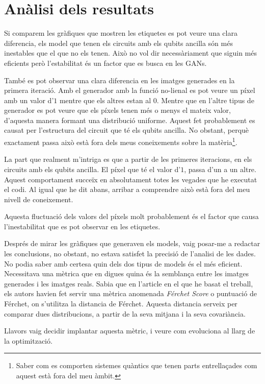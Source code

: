 \section{Anàlisi dels resultats}
Si comparem les gràfiques que mostren les etiquetes es pot veure una clara diferencia, els model que tenen els circuits amb els qubits ancilla són més inestables que el que no els tenen. Això no vol dir necessàriament que siguin més eficients però l'estabilitat és un factor que es busca en les GANs. 

També es pot observar una clara diferencia en les imatges generades en la primera iteració. Amb el generador amb la funció no-lienal es pot veure un píxel amb un valor d'$1$ mentre que els altres estan al $0$. Mentre que en l'altre tipus de generador es pot veure que els píxels tenen més o menys el mateix valor, d'aquesta manera formant una distribució uniforme. Aquest fet probablement es causat per l'estructura del circuit que té els qubits ancilla. No obstant, perquè exactament passa això està fora dels meus coneixements sobre la matèria\footnote{Saber com es comporten sistemes quàntics que tenen parts entrellaçades com aquest està fora del meu àmbit.}. 

La part que realment m'intriga es que a partir de les primeres iteracions, en els circuits amb els qubits ancilla. El píxel que té el valor d'$1$, passa d'un a un altre. Aquest comportament succeïx en absolutament totes les vegades que he executat el codi. Al igual que he dit abans, arribar a comprendre això està fora del meu nivell de coneixement. 

Aquesta fluctuació dels valors del píxels molt probablement és el factor que causa l'inestabilitat que es pot observar en les etiquetes. 

Després de mirar les gràfiques que generaven els models, vaig posar-me a redactar les conclusions, no obstant, no estava satisfet la precisió de l'analisi de les dades. No podia saber amb certesa quin dels dos tipus de models és el més eficient. Necessitava una mètrica que en digues quina és la semblança entre les imatges generades i les imatges reals. Sabia que en l'article en el que he basat el treball, els autors havien fet servir una mètrica anomenada \textit{Férchet Score} o puntuació de Férchet, on s'utilitza la distancia de Férchet. Aquesta distancia serveix per comparar dues distribucions, a partir de la seva mitjana i la seva covariància. 

Llavors vaig decidir implantar aquesta mètric, i veure com evoluciona al llarg de la optimització. 

